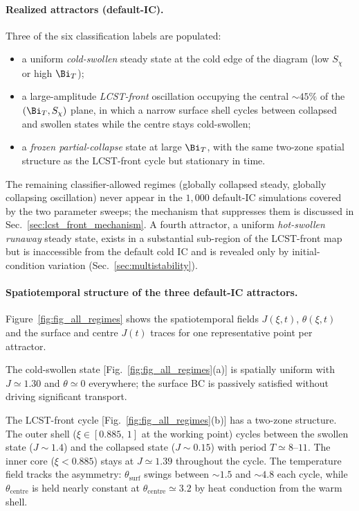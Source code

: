 \paragraph{Realized attractors (default-IC).}
Three of the six classification labels are populated:
\begin{itemize}
\item[(i)] a uniform \emph{cold-swollen} steady state at the cold
  edge of the diagram (low $S_\chi$ or high $\Bi_T$);
\item[(ii)] a large-amplitude \emph{LCST-front} oscillation occupying
  the central $\sim\!45\%$ of the $(\Bi_T,S_\chi)$ plane, in which a
  narrow surface shell cycles between collapsed and swollen states
  while the centre stays cold-swollen;
\item[(iii)] a \emph{frozen partial-collapse} state at large $\Bi_T$,
  with the same two-zone spatial structure as the LCST-front cycle
  but stationary in time.
\end{itemize}
The remaining classifier-allowed regimes (globally collapsed steady,
globally collapsing oscillation) never appear in the $1{,}000$
default-IC simulations covered by the two parameter sweeps; the
mechanism that suppresses them is discussed in
Sec.~\ref{sec:lcst_front_mechanism}.  A fourth attractor, a uniform
\emph{hot-swollen runaway} steady state, exists in a substantial
sub-region of the LCST-front map but is inaccessible from the
default cold IC and is revealed only by initial-condition variation
(Sec.~\ref{sec:multistability}).

\paragraph{Spatiotemporal structure of the three default-IC
attractors.}
Figure~\ref{fig:fig_all_regimes} shows the spatiotemporal fields
$J(\xi,t)$, $\theta(\xi,t)$ and the surface and centre $J(t)$ traces
for one representative point per attractor.

The cold-swollen state [Fig.~\ref{fig:fig_all_regimes}(a)] is
spatially uniform with $J\!\simeq\!1.30$ and $\theta\!\simeq\!0$
everywhere; the surface BC is passively satisfied without driving
significant transport.

The LCST-front cycle [Fig.~\ref{fig:fig_all_regimes}(b)] has a
two-zone structure.  The outer shell ($\xi\!\in\![0.885,\,1]$ at
the working point) cycles between the swollen state
($J\!\sim\!1.4$) and the collapsed state ($J\!\sim\!0.15$) with
period $T\!\simeq\!8\text{--}11$.  The inner core ($\xi<0.885$)
stays at $J\!\simeq\!1.39$ throughout the cycle.  The temperature
field tracks the asymmetry: $\theta_\mathrm{surf}$ swings between
$\sim\!1.5$ and $\sim\!4.8$ each cycle, while
$\theta_\mathrm{centre}$ is held nearly constant at
$\theta_\mathrm{centre}\!\simeq\!3.2$ by heat conduction from the
warm shell.


